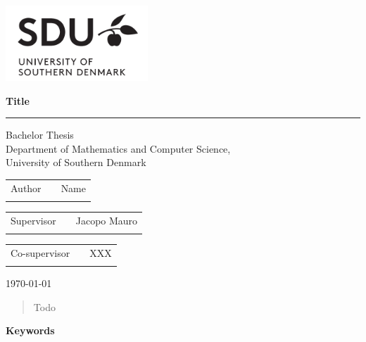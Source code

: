 \documentclass[12pt]{article}
\begin{document}

\begin{titlepage}
\Large
\includegraphics[width=0.4\textwidth]{imgs/logo.png}
\renewcommand{\thepage}{Title}
\thispagestyle{empty}
   \begin{center}
       \vspace*{1cm}
\linespread{1.25}
       {\doublespacing \Huge\textbf{Title}}
\linespread{1}
       \rule{\linewidth}{1pt}
       {\huge Bachelor Thesis \\
       \Large Department of Mathematics and Computer Science, \\
       University of Southern Denmark}
\end{center}
\vspace{5cm}
\Large
\begin{tabularx}{\textwidth}{lXr}
Author & & Name \\ \\
\end{tabularx}
\begin{tabularx}{\textwidth}{lXr}
Supervisor & & Jacopo Mauro\\ \\
\end{tabularx}
\begin{tabularx}{\textwidth}{lXr}
Co-supervisor & & XXX \\ \\
\end{tabularx}

\vfill
\large \today
\end{titlepage}

\thispagestyle{empty}



\thispagestyle{empty}
\tableofcontents
\thispagestyle{empty}
\newpage
{}

\renewcommand{\abstractname}{Abstract}
\begin{abstract}
Todo
\end{abstract}

\begin{center} \bf Keywords \end{center}

\thispagestyle{empty}
\tableofcontents
\thispagestyle{empty}
\newpage
{}
\end{document}
